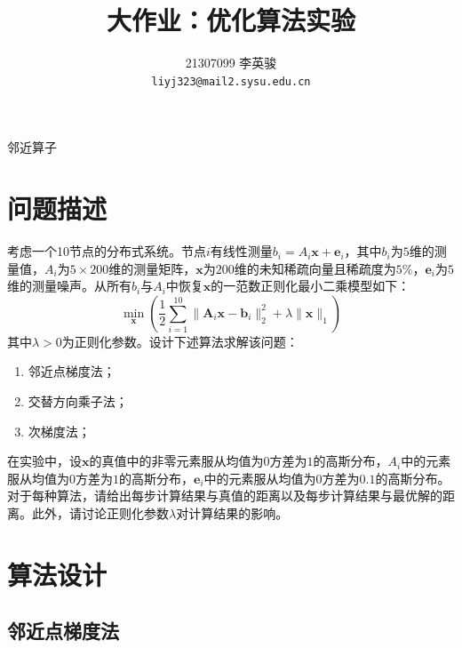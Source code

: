 \documentclass{article}
\title{大作业：优化算法实验}
\author{%
    21307099 李英骏\\
    \texttt{liyj323@mail2.sysu.edu.cn} \\
}
\begin{document}
\maketitle
\tableofcontents

邻近算子\section{问题描述}
考虑一个10节点的分布式系统。节点$i$有线性测量$b_i = A_i \mathbf{x} + \mathbf{e}_i$，其中$b_i$为$5$维的测量值，$A_i$为$5 \times 200$维的测量矩阵，$\mathbf{x}$为$200$维的未知稀疏向量且稀疏度为$5\%$，$\mathbf{e}_i$为$5$维的测量噪声。从所有$b_i$与$A_i$中恢复$\mathbf{x}$的一范数正则化最小二乘模型如下：
\begin{equation}
    \min_{\mathbf{x}} \left( \frac{1}{2} \sum_{i=1}^{10} \|\mathbf{A}_i \mathbf{x} - \mathbf{b}_i\|_2^2 + \lambda \|\mathbf{x}\|_1 \right)
    \label{eq: original_problem}
\end{equation}
其中$\lambda > 0$为正则化参数。设计下述算法求解该问题：
\begin{enumerate}
    \item 邻近点梯度法；
    \item 交替方向乘子法；
    \item 次梯度法；
\end{enumerate}
在实验中，设$\mathbf{x}$的真值中的非零元素服从均值为$0$方差为$1$的高斯分布，$A_i$中的元素服从均值为$0$方差为$1$的高斯分布，$\mathbf{e}_i$中的元素服从均值为$0$方差为$0.1$的高斯分布。对于每种算法，请给出每步计算结果与真值的距离以及每步计算结果与最优解的距离。此外，请讨论正则化参数$\lambda$对计算结果的影响。

\setlength{\parindent}{0em}
\section{算法设计}
\subsection{邻近点梯度法}
\end{document}
